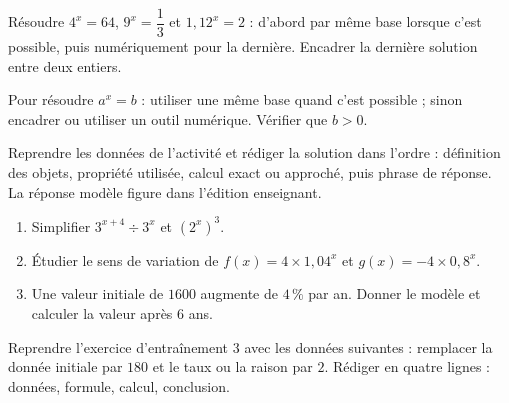 \begin{activite}
Résoudre $4^x=64$, $9^x=\dfrac13$ et $1{,}12^x=2$ : d'abord par même base lorsque c'est possible, puis numériquement pour la dernière. Encadrer la dernière solution entre deux entiers.

\end{activite}

\begin{traceecrite}Pour résoudre $a^x=b$ : utiliser une même base quand c'est possible ; sinon encadrer ou utiliser un outil numérique. Vérifier que $b>0$.\end{traceecrite}

\begin{exemple}
Reprendre les données de l'activité et rédiger la solution dans l'ordre : définition des objets, propriété utilisée, calcul exact ou approché, puis phrase de réponse. La réponse modèle figure dans l'édition enseignant.
\end{exemple}

\begin{exercice}[-- essentiel]
\begin{enumerate}\item Simplifier $3^{x+4}\div3^x$ et $(2^x)^3$.\item Étudier le sens de variation de $f(x)=4\times1{,}04^x$ et $g(x)=-4\times0{,}8^x$.\item Une valeur initiale de $1600$ augmente de $4\,\%$ par an. Donner le modèle et calculer la valeur après $6$ ans.\end{enumerate}
\end{exercice}


\begin{dm}Reprendre l'exercice d'entraînement 3 avec les données suivantes : remplacer la donnée initiale par $180$ et le taux ou la raison par $2$. Rédiger en quatre lignes : données, formule, calcul, conclusion.\end{dm}


